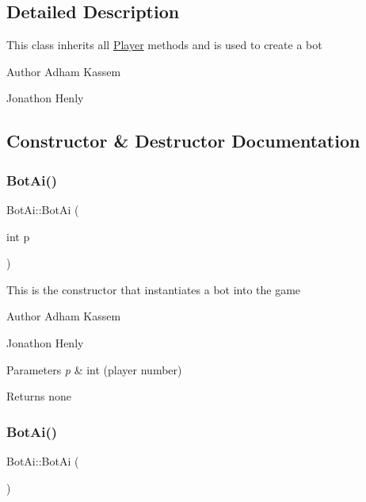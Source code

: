 \subsection{Detailed Description}
This class inherits all \hyperlink{classPlayer}{Player} methods and is used to create a bot \begin{DoxyAuthor}{Author}
Adham Kassem 

Jonathon Henly 
\end{DoxyAuthor}


\subsection{Constructor \& Destructor Documentation}
\mbox{\label{classBotAi_af1cef6cb4b7d04919265e073443e1fc9}} 
\subsubsection{\texorpdfstring{Bot\+Ai()}{BotAi()}\hspace{0.1cm}{\footnotesize\ttfamily [1/2]}}
{\footnotesize\ttfamily Bot\+Ai\+::\+Bot\+Ai (\begin{DoxyParamCaption}\item[{int}]{p }\end{DoxyParamCaption})\hspace{0.3cm}{\ttfamily [inline]}}

This is the constructor that instantiates a bot into the game \begin{DoxyAuthor}{Author}
Adham Kassem 

Jonathon Henly 
\end{DoxyAuthor}

\begin{DoxyParams}{Parameters}
{\em p} & int (player number) \\
\hline
\end{DoxyParams}
\begin{DoxyReturn}{Returns}
none 
\end{DoxyReturn}
\mbox{\label{classBotAi_aeb58b1fa5a7fcf2bd51a3242f21e8b09}} 
\subsubsection{\texorpdfstring{Bot\+Ai()}{BotAi()}\hspace{0.1cm}{\footnotesize\ttfamily [2/2]}}
{\footnotesize\ttfamily Bot\+Ai\+::\+Bot\+Ai (\begin{DoxyParamCaption}{ }\end{DoxyParamCaption})\hspace{0.3cm}{\ttfamily [inline]}}

